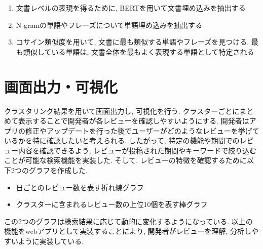\begin{enumerate}
  \item 文書レベルの表現を得るために, BERTを用いて文書埋め込みを抽出する
  \item N-gramの単語やフレーズについて単語埋め込みを抽出する
  \item コサイン類似度を用いて, 文書に最も類似する単語やフレーズを見つける. 最も類似している単語は, 文書全体を最もよく表現する単語として特定される
\end{enumerate}


\section{画面出力・可視化}
クラスタリング結果を用いて画面出力し, 可視化を行う. クラスターごとにまとめて表示することで開発者が各レビューを確認しやすいようにする. 
開発者はアプリの修正やアップデートを行った後でユーザーがどのようなレビューを挙げているかを特に確認したいと考えられる. したがって, 特定の機能や期間でのレビュー内容を確認できるよう, レビューが投稿された期間やキーワードで絞り込むことが可能な検索機能を実装した. 
そして, レビューの特徴を確認するために以下2つのグラフを作成した.
\begin{itemize}
  \item 日ごとのレビュー数を表す折れ線グラフ
  \item クラスターに含まれるレビュー数の上位10個を表す棒グラフ
\end{itemize}
この2つのグラフは検索結果に応じて動的に変化するようになっている. 以上の機能をwebアプリとして実装することにより, 開発者がレビューを理解, 分析しやすいように実装している. 